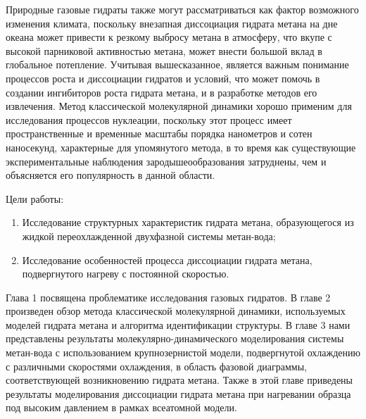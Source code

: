 Природные газовые гидраты также могут рассматриваться как фактор возможного изменения климата, поскольку внезапная диссоциация гидрата метана на дне океана может привести к резкому выбросу метана в атмосферу, что вкупе с высокой парниковой активностью метана, может внести большой вклад в глобальное потепление. Учитывая вышесказанное, является важным понимание процессов роста и диссоциации гидратов и условий, что может помочь в создании ингибиторов роста гидрата метана, и в разработке методов его извлечения. Метод классической молекулярной динамики хорошо применим для исследования процессов нуклеации, поскольку этот процесс имеет пространственные и временные масштабы порядка нанометров и сотен наносекунд, характерные для упомянутого метода, в то время как существующие экспериментальные наблюдения зародышеообразования затруднены, чем и объясняется его популярность в данной области.

Цели работы:
\begin{enumerate}
\item Исследование структурных характеристик гидрата метана, образующегося из жидкой переохлажденной двухфазной системы метан-вода;
\item Исследование особенностей процесса диссоциации гидрата метана, подвергнутого нагреву с постоянной скоростью.
\end{enumerate}

Глава 1 посвящена проблематике исследования газовых гидратов. В главе 2 произведен обзор метода классической молекулярной динамики, используемых моделей гидрата метана и алгоритма идентификации структуры. В главе 3 нами представлены результаты молекулярно-динамического моделирования системы метан-вода с использованием крупнозернистой модели, подвергнутой охлаждению с различными скоростями охлаждения, в область фазовой диаграммы, соответствующей возникновению гидрата метана. Также в этой главе приведены результаты моделирования диссоциации гидрата метана при нагревании образца под высоким давлением в рамках всеатомной модели.